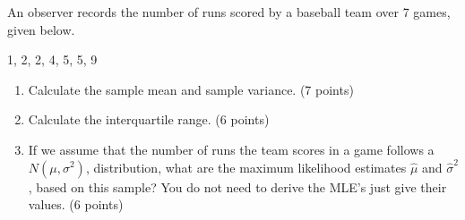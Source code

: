 \item An observer records the number of runs scored by a baseball team over 7 games, given below.

1, 2, 2, 4, 5, 5, 9

\begin{enumerate}
\item Calculate the sample mean and sample variance. (7 points)

\vfill
\item Calculate the interquartile range. (6 points)

\vfill
\item If we assume that the number of runs the team scores in a game follows a $N(\mu, \sigma^2)$, distribution, what are the maximum likelihood estimates $\hat{\mu}$ and $\hat{\sigma}^2$, based on this sample? You do not need to derive the MLE's just give their values. (6 points)

\vfill
\end{enumerate}